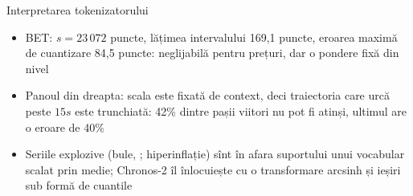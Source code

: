 \begin{frame}{Interpretarea tokenizatorului}
\itemsize{\small}
\begin{itemize}
    \item BET: $s = 23\,072$ puncte, lățimea intervalului 169{,}1 puncte, eroarea maximă de cuantizare 84{,}5 puncte: neglijabilă pentru prețuri, dar o pondere fixă din nivel
    \item Panoul din dreapta: scala este fixată de context, deci traiectoria care urcă peste $15s$ este trunchiată: 42\% dintre pașii viitori nu pot fi atinși, ultimul are o eroare de 40\%
    \item Seriile explozive (bule, ; hiperinflație) sînt în afara suportului unui vocabular scalat prin medie; Chronos-2 îl înlocuiește cu o transformare arcsinh și ieșiri sub formă de cuantile
\end{itemize}
\end{frame}

